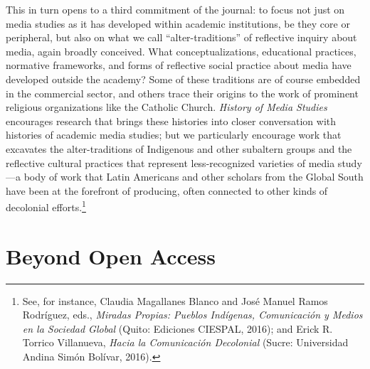 \documentclass{tufte-handout}
\begin{document}
This in turn opens to a third commitment of the journal: to focus not
just on media studies as it has developed within academic institutions,
be they core or peripheral, but also on what we call
``alter-traditions'' of reflective inquiry about media, again broadly
conceived. What conceptualizations, educational practices, normative
frameworks, and forms of reflective social practice about media have
developed outside the academy? Some of these traditions are of course
embedded in the commercial sector, and others trace their origins to the
work of prominent religious organizations like the Catholic Church.
\emph{History of Media Studies} encourages research that brings these
histories into closer conversation with histories of academic media
studies; but we particularly encourage work that excavates the
alter-traditions of Indigenous and other subaltern groups and the
reflective cultural practices that represent less-recognized varieties
of media study---a body of work that Latin Americans and other scholars
from the Global South have been at the forefront of producing, often
connected to other kinds of decolonial
efforts.\footnote{See, for instance, Claudia Magallanes Blanco and José Manuel Ramos
  Rodríguez, eds., \emph{Miradas Propias: Pueblos Indígenas,
  Comunicación y Medios en la Sociedad Global} (Quito: Ediciones
  CIESPAL, 2016); and Erick R. Torrico Villanueva, \emph{Hacia la Comunicación Decolonial} (Sucre: Universidad Andina Simón Bolívar, 2016).
}

\hypertarget{beyond-open-access}{%
\section{Beyond Open Access}\label{beyond-open-access}}
\end{document}
